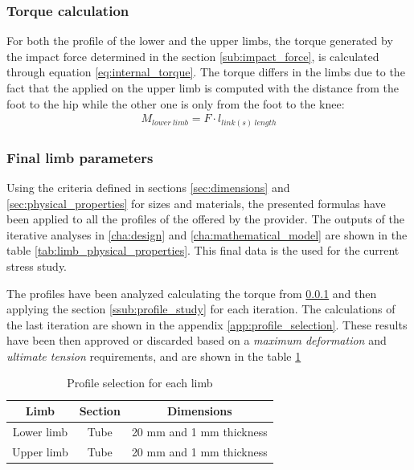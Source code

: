 \subsubsection{Torque calculation} %
\label{ssub:torque_calculation}
  For both the profile of the lower and the upper limbs, the torque generated by the impact force determined in the section \ref{sub:impact_force}, is calculated through equation \ref{eq:internal_torque}.
  The torque differs in the limbs due to the fact that the applied on the upper limb is computed with the distance from the foot to the hip while the other one is only from the foot to the knee:
  \begin{equation}
  \begin{aligned}
  \label{eq:internal_torque}
     M_{lower\ limb} = F \cdot l_{link(s)\ length}
  \end{aligned}
  \end{equation}

\subsubsection{Final limb parameters} %
\label{ssub:final_limb_parameters}
Using the criteria defined in sections \ref{sec:dimensions} and \ref{sec:physical_properties} for sizes and materials, the presented formulas have been applied to all the profiles of the offered by the provider.
The outputs of the iterative analyses in \ref{cha:design} and \ref{cha:mathematical_model} are shown in the table \ref{tab:limb_physical_properties}. 
This final data is the used for the current stress study.

The profiles have been analyzed calculating the torque from \ref{ssub:torque_calculation} and then applying the section \ref{ssub:profile_study} for each iteration.
The calculations of the last iteration are shown in the appendix \ref{app:profile_selection}.
These results have been then approved or discarded based on a \textit{maximum deformation} and \textit{ultimate tension} requirements, and are shown in the table \ref{tab:profile_selection}

\begin{table}[ht!]
\centering
\caption{Profile selection for each limb}
\label{tab:profile_selection}
\begin{tabular}{c|c|c}
  \textbf{Limb} & \textbf{Section} & \textbf{Dimensions} \\ \hline
  Lower limb & Tube & 20 mm and 1 mm thickness \\ \hline
  Upper limb & Tube & 20 mm and 1 mm thickness 
\end{tabular}
\end{table}




